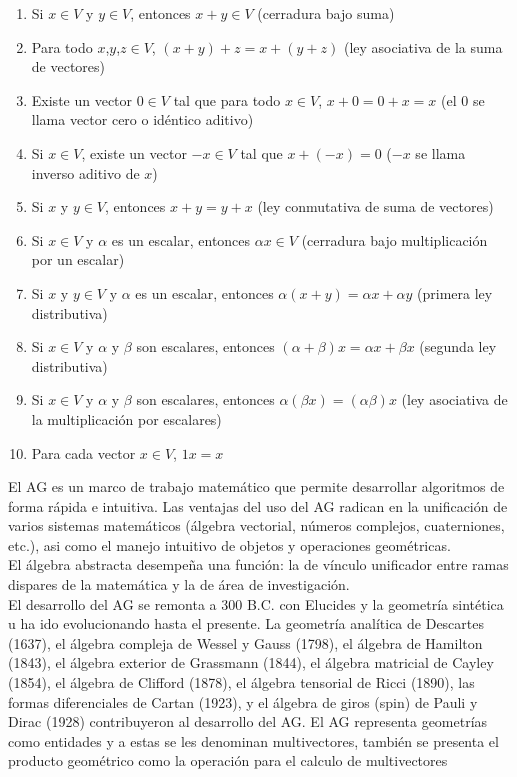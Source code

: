        \begin{enumerate}
       	\item Si $x \in V$ y $y \in V$, entonces $x+y \in V$ (cerradura bajo suma)
       	\item Para todo $x$,$y$,$z \in V$, $(x+y)+z=x+(y+z)$ (ley asociativa de la suma de vectores)
       	\item Existe un vector $0 \in V$ tal que para todo $x \in V$, $x+0=0+x=x$ (el $0$ se llama vector cero o idéntico aditivo)
       	\item Si $x \in V$, existe un vector $-x \in V$ tal que $x+(-x)=0$ ($-x$ se llama inverso aditivo de $x$)
       	\item Si $x$ y $y \in V$, entonces $x+y=y+x$ (ley conmutativa de suma de vectores)
       	\item Si $x \in V$ y $\alpha$ es un escalar, entonces $\alpha x \in V$ (cerradura bajo multiplicación por un escalar)
       	\item Si $x$ y $y \in V$ y $\alpha$ es un escalar, entonces $\alpha(x+y) =\alpha x+ \alpha y$ (primera ley distributiva)
       	\item Si $x \in V$ y $\alpha$ y  $\beta$ son escalares, entonces $(\alpha+\beta)x= \alpha x+ \beta x$ (segunda ley distributiva)
       	\item Si $x \in V$ y $\alpha$ y $\beta$ son escalares, entonces $\alpha(\beta x)=(\alpha \beta)x$
       	(ley asociativa de la multiplicación por escalares)
       	\item Para cada vector $x \in V$, $1x=x$
       \end{enumerate}
        
        
        El AG es un marco de trabajo matemático que permite desarrollar algoritmos de forma rápida e intuitiva. Las ventajas del uso del AG radican en la unificación de varios sistemas matemáticos (álgebra vectorial, números complejos, cuaterniones, etc.), asi como el manejo intuitivo de objetos y operaciones geométricas\cite{FoundOfAGC}.\\
        
        El álgebra abstracta desempeña una función: la de vínculo unificador entre ramas dispares de la matemática y la de
        área de investigación. \\
        
        
        
        
        
        El desarrollo del AG se remonta a 300 B.C. con Elucides y la geometría sintética u ha ido evolucionando hasta el presente. La geometría analítica de Descartes (1637), el álgebra compleja de Wessel y Gauss (1798), el álgebra de Hamilton (1843), el álgebra exterior de Grassmann (1844), el álgebra matricial de Cayley (1854), el álgebra de Clifford (1878), el álgebra tensorial de Ricci (1890), las formas diferenciales de Cartan (1923), y el álgebra de giros (spin) de Pauli y Dirac (1928) contribuyeron al desarrollo del AG. El AG representa geometrías como entidades y a estas se les denominan multivectores, también se presenta el producto geométrico como la operación para el calculo de multivectores\cite{BayroCorrochano2010}\\
        
